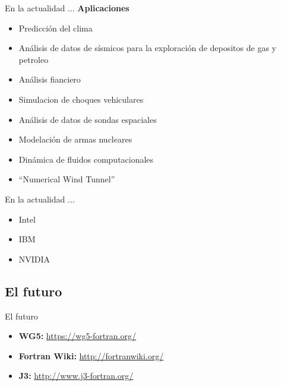 \begin{frame}[fragile]{En la actualidad ...}
  \textbf{Aplicaciones}
  \begin{itemize}[<+(1)->]
    \item Predicción del clima
    \item Análisis de datos de sísmicos para la exploración de depositos de gas y petroleo
    \item Análisis fianciero
    \item Simulacion de choques vehiculares
    \item Análisis de datos de sondas espaciales
    \item Modelación de armas nucleares
    \item Dinámica de fluidos computacionales
    \item ``Numerical Wind Tunnel''
  \end{itemize}
\end{frame}


\begin{frame}[fragile]{En la actualidad ...}
  \begin{itemize}[<+(1)->]
    \item Intel
    \item IBM
    \item NVIDIA
  \end{itemize}
\end{frame}


\subsection{El futuro}
\begin{frame}[fragile]{El futuro}
  \begin{itemize}[<+(1)->]
    \item \textbf{WG5: }\url{https://wg5-fortran.org/}
    \item \textbf{Fortran Wiki: }\url{http://fortranwiki.org/}
    \item \textbf{J3: }\url{http://www.j3-fortran.org/}
  \end{itemize}
\end{frame}
